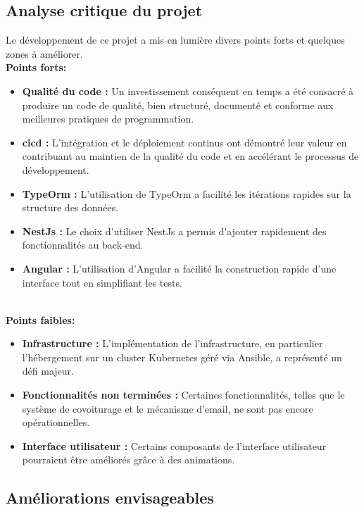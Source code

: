 \subsection{Analyse critique du projet}\label{subsec:analyse-critique}

Le développement de ce projet a mis en lumière divers points forts et quelques zones à améliorer.\\

\textbf{Points forts:}
\begin{itemize}
    \item \textbf{Qualité du code :} Un investissement conséquent en temps a été consacré à produire un code de qualité, bien structuré, documenté et conforme aux meilleures pratiques de programmation.
    \item \textbf{\Gls{cicd} :} L'intégration et le déploiement continus ont démontré leur valeur en contribuant au maintien de la qualité du code et en accélérant le processus de développement.
    \item \textbf{TypeOrm :} L'utilisation de TypeOrm a facilité les itérations rapides sur la structure des données.
    \item \textbf{NestJs :} Le choix d'utiliser NestJs a permis d'ajouter rapidement des fonctionnalités au back-end.
    \item \textbf{Angular :} L'utilisation d'Angular a facilité la construction rapide d'une interface tout en simplifiant les tests.
\end{itemize}\\

\textbf{Points faibles:}
\begin{itemize}
    \item \textbf{Infrastructure :} L'implémentation de l'infrastructure, en particulier l'hébergement sur un cluster Kubernetes géré via Ansible, a représenté un défi majeur.
    \item \textbf{Fonctionnalités non terminées :} Certaines fonctionnalités, telles que le système de covoiturage et le mécanisme d'email, ne sont pas encore opérationnelles.
    \item \textbf{Interface utilisateur :} Certains composants de l'interface utilisateur pourraient être améliorés grâce à des animations.
\end{itemize}

\subsection{Améliorations envisageables}\label{subsec:ameliorations}

